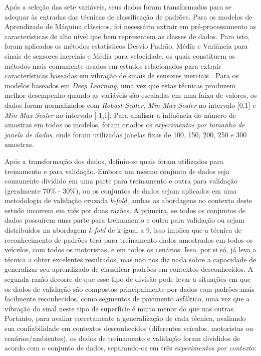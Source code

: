 Após a seleção das sete variáveis, seus dados foram transformados para se adequar às entradas das técnicas de classificação de padrões. Para os modelos de Aprendizado de Máquina clássicos, foi necessário extrair em pré-processamento as características de alto nível que bem representem as classes de dados. Para isto, foram aplicados os métodos estatísticos Desvio Padrão, Média e Variância para sinais de sensores inerciais e Média para velocidade, os quais constituem os métodos mais comumente usados em estudos relacionados para extrair características baseadas em vibração de sinais de sensores inerciais \cite{Alqudah2016,Andria2016,BelloSalau2018,Bose2018,Hou2017,Li2016,Lima2016,Pholprasit2015,Prapulla2017,Savera2016,Singh2017}. Para os modelos baseados em \textit{Deep Learning}, uma vez que estas técnicas produzem melhor desempenho quando as variáveis são escaladas em uma faixa de valores, os dados foram normalizados com \textit{Robust Scaler}, \textit{Min Max Scaler} no intervalo [0,1] e \textit{Min Max Scaler} no intervalo [-1,1]. Para analisar a influência do número de amostras em todos os modelos, foram criados os \emph{experimentos por tamanho de janela de dados}, onde foram utilizadas janelas fixas de 100, 150, 200, 250 e 300 amostras. 

Após a transformação dos dados, definiu-se quais foram utilizados para treinamento e para validação. Embora um mesmo conjunto de dados seja comumente dividido em uma parte para treinamento e outra para validação (geralmente 70\% - 30\%), ou os conjuntos de dados sejam aplicados em uma metodologia de validação cruzada \textit{k-fold}, ambas as abordagens no contexto deste estudo incorrem em viés por duas razões. A primeira, se todos os conjuntos de dados possuírem uma parte para treinamento e outra para validação ou sejam distribuídos na abordagem \textit{k-fold} de k igual a 9, isso implica que a técnica de reconhecimento de padrões terá para treinamento dados amostrados em todos os veículos, com todos os motoristas, e em todos os cenários. Isso, por si só, já leva a técnica a obter excelentes resultados, mas não nos diz nada sobre a capacidade de generalizar seu aprendizado de classificar padrões em contextos desconhecidos. A segunda razão decorre de que esse tipo de divisão pode levar a situações em que os dados de validação são compostos principalmente por dados com padrões mais facilmente reconhecidos, como segmentos de pavimento asfáltico, uma vez que a vibração do sinal neste tipo de superfície é muito menor do que nas outras. Portanto, para avaliar corretamente a generalização de cada técnica, avaliando sua confiabilidade em contextos desconhecidos (diferentes veículos, motoristas ou cenários/ambientes), os dados de treinamento e validação foram divididos de acordo com o conjunto de dados, separando-os em três \emph{experimentos por contexto}:

